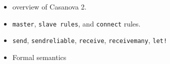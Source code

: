 \begin{itemize}[noitemsep]
	\item overview of Casanova 2.
	\item \texttt{master}, \texttt{slave rules}, and \texttt{connect} rules.
	\item \texttt{send}, \texttt{send\textunderscore reliable}, \texttt{receive}, \texttt{receive\textunderscore many}, \texttt{let!}
	\item Formal semantics
\end{itemize}